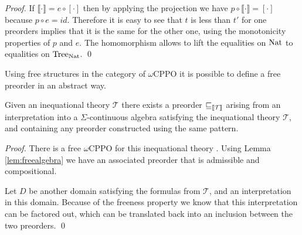\begin{proof}
    If $\llbracket \cdot \rrbracket = e \circ [ \cdot ]$ then 
    by applying the projection we have $p \circ \llbracket \cdot \rrbracket
     = [\cdot]$ because $p \circ e = id$. Therefore 
     it is easy to see that $t$ is less than $t'$ for one preorders 
     implies that it is the same for the other one, using the 
     monotonicity properties of $p$ and $e$. The homomorphism 
     allows to lift the equalities on $\textnormal{Nat}$ to equalities on $\textnormal{Tree}_{\textnormal{Nat}}$.
\qed\end{proof}

Using free structures in the category 
of $\omega$CPPO it is possible to define 
a free preorder in an abstract way.

\begin{lemma}
    \label{lem:freedomainpreorder}
    Given an inequational theory $\mathcal{T}$
    there exists a preorder $\sqsubseteq_{\llbracket \mathcal{T} \rrbracket}$
    arising from an interpretation into a $\Sigma$-continuous algebra satisfying the 
    inequational theory $\mathcal{T}$, and containing 
    any preorder constructed using the same pattern.
\end{lemma}

\begin{proof}
    There is a free $\omega$CPPO for this inequational 
    theory \cite{abramsky1994}. Using Lemma \ref{lem:freealgebra}
    we have an associated preorder that is admissible and compositional.
    
    Let $D$ be another domain satisfying the formulas from $\mathcal{T}$,
    and an interpretation in this domain. Because of the 
    freeness property we know that this interpretation 
    can be factored out, which can be translated back into 
    an inclusion between the two preorders.
\qed\end{proof}

